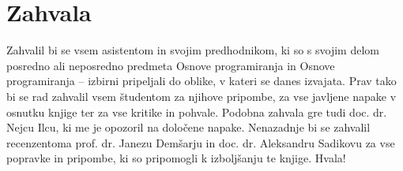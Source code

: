 \chapter*{Zahvala}

Zahvalil bi se vsem asistentom in svojim predhodnikom, ki so s svojim delom posredno ali neposredno predmeta Osnove programiranja in Osnove programiranja -- izbirni pripeljali do oblike, v kateri se danes izvajata. Prav tako bi se rad zahvalil vsem študentom za njihove pripombe, za vse javljene napake v osnutku knjige ter za vse kritike in pohvale. Podobna zahvala gre tudi doc. dr. Nejcu Ilcu, ki me je opozoril na določene napake. Nenazadnje bi se zahvalil recenzentoma prof. dr. Janezu Demšarju in doc. dr. Aleksandru Sadikovu za vse popravke in pripombe, ki so pripomogli k izboljšanju te knjige. Hvala!


